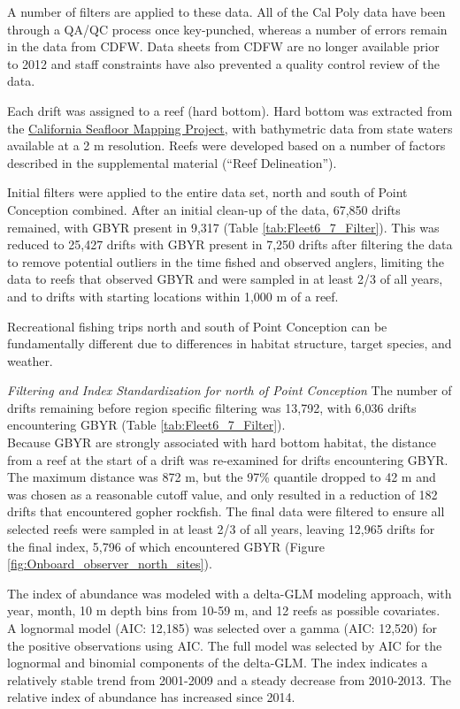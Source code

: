 \documentclass[12pt,]{article}
\begin{document}
A number of filters are applied to these data. All of the Cal Poly data
have been through a QA/QC process once key-punched, whereas a number of
errors remain in the data from CDFW. Data sheets from CDFW are no longer
available prior to 2012 and staff constraints have also prevented a
quality control review of the data.

Each drift was assigned to a reef (hard bottom). Hard bottom was
extracted from the
\href{http://seafloor.otterlabs.org/index.html}{California Seafloor
Mapping Project}, with bathymetric data from state waters available at a
2 m resolution. Reefs were developed based on a number of factors
described in the supplemental material (``Reef Delineation'').

Initial filters were applied to the entire data set, north and south of
Point Conception combined. After an initial clean-up of the data, 67,850
drifts remained, with GBYR present in 9,317 (Table
\ref{tab:Fleet6_7_Filter}). This was reduced to 25,427 drifts with GBYR
present in 7,250 drifts after filtering the data to remove potential
outliers in the time fished and observed anglers, limiting the data to
reefs that observed GBYR and were sampled in at least 2/3 of all years,
and to drifts with starting locations within 1,000 m of a reef.

Recreational fishing trips north and south of Point Conception can be
fundamentally different due to differences in habitat structure, target
species, and weather.

\emph{Filtering and Index Standardization for north of Point Conception}
The number of drifts remaining before region specific filtering was
13,792, with 6,036 drifts encountering GBYR (Table
\ref{tab:Fleet6_7_Filter}).\\
Because GBYR are strongly associated with hard bottom habitat, the
distance from a reef at the start of a drift was re-examined for drifts
encountering GBYR. The maximum distance was 872 m, but the 97\% quantile
dropped to 42 m and was chosen as a reasonable cutoff value, and only
resulted in a reduction of 182 drifts that encountered gopher rockfish.
The final data were filtered to ensure all selected reefs were sampled
in at least 2/3 of all years, leaving 12,965 drifts for the final index,
5,796 of which encountered GBYR (Figure
\ref{fig:Onboard_observer_north_sites}).

The index of abundance was modeled with a delta-GLM modeling approach,
with year, month, 10 m depth bins from 10-59 m, and 12 reefs as possible
covariates. A lognormal model (AIC: 12,185) was selected over a gamma
(AIC: 12,520) for the positive observations using AIC. The full model
was selected by AIC for the lognormal and binomial components of the
delta-GLM. The index indicates a relatively stable trend from 2001-2009
and a steady decrease from 2010-2013. The relative index of abundance
has increased since 2014.
\end{document}
